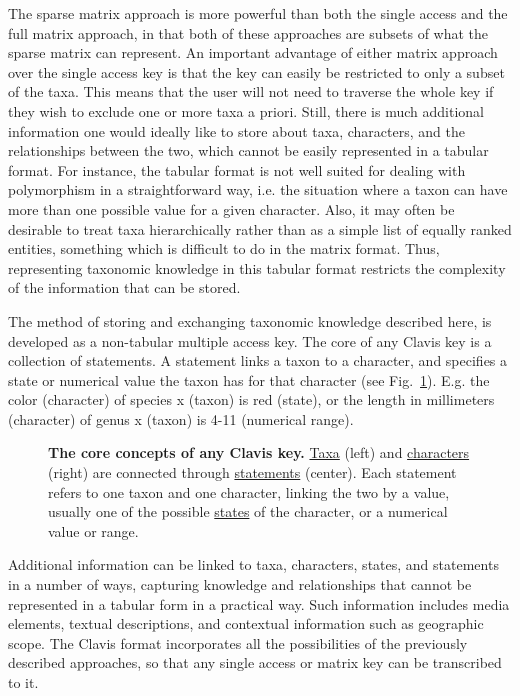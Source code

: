 \documentclass[10pt,letterpaper]{article}
\begin{document}
The sparse matrix approach is more powerful than both the single access and the full matrix approach, in that both of these approaches are subsets of what the sparse matrix can represent. An important advantage of either matrix approach over the single access key is that the key can easily be restricted to only a subset of the taxa. This means that the user will not need to traverse the whole key if they wish to exclude one or more taxa a priori. Still, there is much additional information one would ideally like to store about taxa, characters, and the relationships between the two, which cannot be easily represented in a tabular format. For instance, the tabular format is not well suited for dealing with polymorphism in a straightforward way, i.e. the situation where a taxon can have more than one possible value for a given character. Also, it may often be desirable to treat taxa hierarchically rather than as a simple list of equally ranked entities, something which is difficult to do in the matrix format. Thus, representing taxonomic knowledge in this tabular format restricts the complexity of the information that can be stored.

The method of storing and exchanging taxonomic knowledge described here, is developed as a non-tabular multiple access key. The core of any Clavis key is a collection of statements. A statement links a taxon to a character, and specifies a state or numerical value the taxon has for that character (see Fig.~\ref{fig1}). E.g. the color (character) of species x (taxon) is red (state), or the length in millimeters (character) of genus x (taxon) is 4-11 (numerical range).




\begin{figure}[!h]
  \caption{{\bf The core concepts of any Clavis key.}
  \underline{Taxa} (left) and \underline{characters} (right) are connected through \underline{statements} (center). Each statement refers to one taxon and one character, linking the two by a value, usually one of the possible \underline{states} of the character, or a numerical value or range.}
  \label{fig1}
\end{figure}

Additional information can be linked to taxa, characters, states, and statements in a number of ways, capturing knowledge and relationships that cannot be represented in a tabular form in a practical way. Such information includes media elements, textual descriptions, and contextual information such as geographic scope. The Clavis format incorporates all the possibilities of the previously described approaches, so that any single access or matrix key can be transcribed to it.
\end{document}
